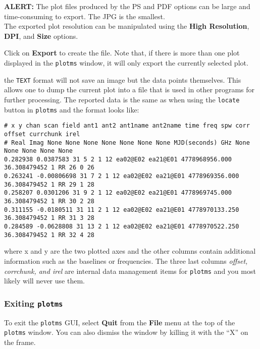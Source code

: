 {\bf ALERT:} The plot files produced by the PS and PDF options can be
large and time-consuming to export.  The JPG is the smallest.\\


The exported plot resolution can be manipulated using the {\bf High
  Resolution}, {\bf DPI}, and {\bf Size} options.

Click on {\bf Export} to create the file. Note that, if there is more
than one plot displayed in the {\tt plotms} window,
it will only export the currently selected plot.

the {\tt TEXT} format will not save an image but the data points
themselves. This allows one to dump the current plot into a file that
is used in other programs for further processing. The reported data is
the same as when using the {\tt locate} button in {\tt plotms} and the
format looks like:

\small
\begin{verbatim}
# x y chan scan field ant1 ant2 ant1name ant2name time freq spw corr offset currchunk irel
# Real Imag None None None None None None None MJD(seconds) GHz None None None None None
0.282938 0.0387583 31 5 2 1 12 ea02@E02 ea21@E01 4778968956.000 36.308479452 1 RR 26 0 26
0.263241 -0.00806698 31 7 2 1 12 ea02@E02 ea21@E01 4778969356.000 36.308479452 1 RR 29 1 28
0.258207 0.0301206 31 9 2 1 12 ea02@E02 ea21@E01 4778969745.000 36.308479452 1 RR 30 2 28
0.311155 -0.0180511 31 11 2 1 12 ea02@E02 ea21@E01 4778970133.250 36.308479452 1 RR 31 3 28
0.284589 -0.0628808 31 13 2 1 12 ea02@E02 ea21@E01 4778970522.250 36.308479452 1 RR 32 4 28
\end{verbatim}
\normalsize

where x and y are the two plotted axes and the other columns contain
additional information such as the baselines or frequencies. The three
last columns {\it offset, corrchunk, and irel} are internal data
management items for {\tt plotms} and you most likely will never use them. 


\subsubsection{Exiting {\tt plotms}}
\label{section:edit.plot.plotms.exit}

To exit the {\tt plotms} GUI, select {\bf Quit} from the {\bf File} menu at the top of the {\tt plotms} window. You can also dismiss the window by killing it with the ``X'' on the frame.

